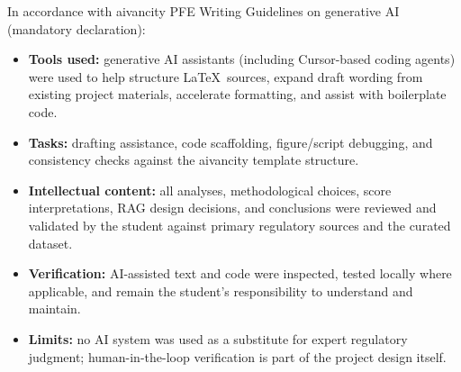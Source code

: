 
In accordance with aivancity PFE Writing Guidelines on generative AI (mandatory declaration):

\begin{itemize}
  \item \textbf{Tools used:} generative AI assistants (including Cursor-based coding agents)
        were used to help structure \LaTeX\ sources, expand draft wording from existing project
        materials, accelerate formatting, and assist with boilerplate code.
  \item \textbf{Tasks:} drafting assistance, code scaffolding, figure/script debugging, and
        consistency checks against the aivancity template structure.
  \item \textbf{Intellectual content:} all analyses, methodological choices, score
        interpretations, RAG design decisions, and conclusions were reviewed and validated by
        the student against primary regulatory sources and the curated dataset.
  \item \textbf{Verification:} AI-assisted text and code were inspected, tested locally where
        applicable, and remain the student's responsibility to understand and maintain.
  \item \textbf{Limits:} no AI system was used as a substitute for expert regulatory judgment;
        human-in-the-loop verification is part of the project design itself.
\end{itemize}
